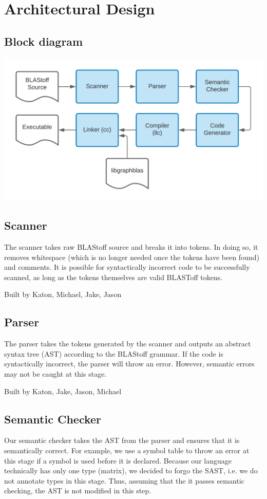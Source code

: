 \section{Architectural Design}
\subsection{Block diagram}
\includegraphics[width=\textwidth]{figures/block-diagram.png}
\subsection{Scanner}
The scanner takes raw BLAStoff source and breaks it into tokens. In doing
so, it removes whitespace (which is no longer needed once the tokens have
been found) and comments. It is possible for syntactically incorrect code to
be successfully scanned, as long as the tokens themselves are valid BLASToff
tokens.

Built by Katon, Michael, Jake, Jason

\subsection{Parser}
The parser takes the tokens generated by the scanner and outputs an abstract
syntax tree (AST) according to the BLAStoff grammar. If the code is
syntactically incorrect, the parser will throw an error. However, semantic
errors may not be caught at this stage.

Built by Katon, Jake, Jason, Michael

\subsection{Semantic Checker}
Our semantic checker takes the AST from the parser and ensures that it is
semantically correct. For example, we use a symbol table to throw an error
at this stage if a symbol is used before it is declared. Because our
language technically has only one type (matrix), we decided to forgo the
SAST, i.e. we do not annotate types in this stage. Thus, assuming that the
it passes semantic checking, the AST is not modified in this step.

